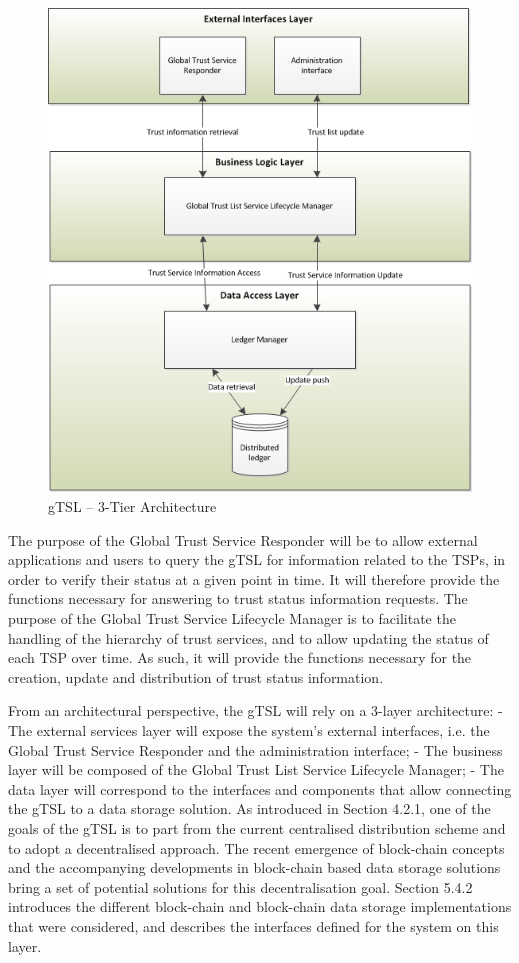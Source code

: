 \documentclass{tnreport}
\begin{document}
\begin{figure}[h]
	\centering
	\includegraphics{figures/gTSL-3Tier}
	\caption{gTSL – 3-Tier Architecture}
	\label{fig:3tier-archi}
\end{figure}

The purpose of the Global Trust Service Responder will be to allow external applications and users to query the gTSL for information related to the TSPs, in order to verify their status at a given point in time. It will therefore provide the functions necessary for answering to trust status information requests.
The purpose of the Global Trust Service Lifecycle Manager is to facilitate the handling of the hierarchy of trust services, and to allow updating the status of each TSP over time. As such, it will provide the functions necessary for the creation, update and distribution of trust status information.

From an architectural perspective, the gTSL will rely on a 3-layer architecture:
- The external services layer will expose the system’s external interfaces, i.e. the Global Trust Service Responder and the administration interface;
- The business layer will be composed of the Global Trust List Service Lifecycle Manager;
- The data layer will correspond to the interfaces and components that allow connecting the gTSL to a data storage solution.
As introduced in Section 4.2.1, one of the goals of the gTSL is to part from the current centralised distribution scheme and to adopt a decentralised approach. The recent emergence of block-chain concepts and the accompanying developments in block-chain based data storage solutions bring a set of potential solutions for this decentralisation goal. Section 5.4.2 introduces the different block-chain and block-chain data storage implementations that were considered, and describes the interfaces defined for the system on this layer.
\end{document}
